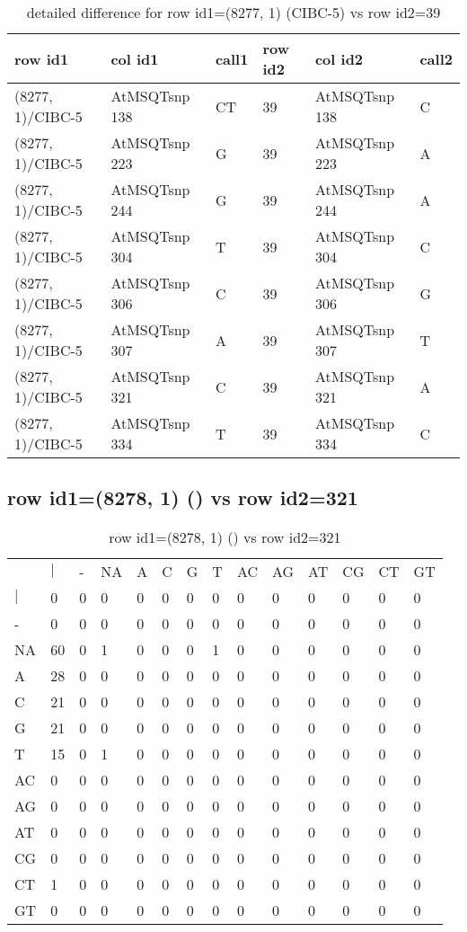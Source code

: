 \begin{center}
\begin{longtable}{|l|l|l|l|l|l|}
\caption{detailed difference for row id1=(8277, 1) (CIBC-5) vs row id2=39} \label{table_dm243}\\
\hline
row id1&col id1&call1&row id2&col id2&call2\\
\hline
(8277, 1)/CIBC-5&AtMSQTsnp 138&CT&39&AtMSQTsnp 138&C\\
(8277, 1)/CIBC-5&AtMSQTsnp 223&G&39&AtMSQTsnp 223&A\\
(8277, 1)/CIBC-5&AtMSQTsnp 244&G&39&AtMSQTsnp 244&A\\
(8277, 1)/CIBC-5&AtMSQTsnp 304&T&39&AtMSQTsnp 304&C\\
(8277, 1)/CIBC-5&AtMSQTsnp 306&C&39&AtMSQTsnp 306&G\\
(8277, 1)/CIBC-5&AtMSQTsnp 307&A&39&AtMSQTsnp 307&T\\
(8277, 1)/CIBC-5&AtMSQTsnp 321&C&39&AtMSQTsnp 321&A\\
(8277, 1)/CIBC-5&AtMSQTsnp 334&T&39&AtMSQTsnp 334&C\\
\hline
\end{longtable}
\end{center}

\subsection{row id1=(8278, 1) () vs row id2=321}
\begin{center}
\begin{longtable}{|l|l|l|l|l|l|l|l|l|l|l|l|l|l|}
\caption{row id1=(8278, 1) () vs row id2=321} \label{table_dm244}\\
\hline
\\
\hline
&$|$&-&NA&A&C&G&T&AC&AG&AT&CG&CT&GT\\
$|$&0&0&0&0&0&0&0&0&0&0&0&0&0\\
-&0&0&0&0&0&0&0&0&0&0&0&0&0\\
NA&60&0&1&0&0&0&1&0&0&0&0&0&0\\
A&28&0&0&0&0&0&0&0&0&0&0&0&0\\
C&21&0&0&0&0&0&0&0&0&0&0&0&0\\
G&21&0&0&0&0&0&0&0&0&0&0&0&0\\
T&15&0&1&0&0&0&0&0&0&0&0&0&0\\
AC&0&0&0&0&0&0&0&0&0&0&0&0&0\\
AG&0&0&0&0&0&0&0&0&0&0&0&0&0\\
AT&0&0&0&0&0&0&0&0&0&0&0&0&0\\
CG&0&0&0&0&0&0&0&0&0&0&0&0&0\\
CT&1&0&0&0&0&0&0&0&0&0&0&0&0\\
GT&0&0&0&0&0&0&0&0&0&0&0&0&0\\
\hline
\end{longtable}
\end{center}

